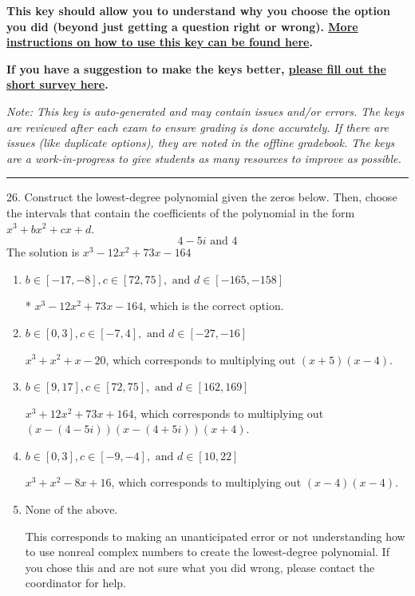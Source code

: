 \documentclass{article}[14pt]
\begin{document}
\textbf{This key should allow you to understand why you choose the option you did (beyond just getting a question right or wrong). \href{https://xronos.clas.ufl.edu/mac1105spring2020/courseDescriptionAndMisc/Exams/LearningFromResults}{More instructions on how to use this key can be found here}.}

\textbf{If you have a suggestion to make the keys better, \href{https://forms.gle/CZkbZmPbC9XALEE88}{please fill out the short survey here}.}

\textit{Note: This key is auto-generated and may contain issues and/or errors. The keys are reviewed after each exam to ensure grading is done accurately. If there are issues (like duplicate options), they are noted in the offline gradebook. The keys are a work-in-progress to give students as many resources to improve as possible.}

\rule{\textwidth}{0.4pt}

26. Construct the lowest-degree polynomial given the zeros below. Then, choose the intervals that contain the coefficients of the polynomial in the form $x^3+bx^2+cx+d$.
$$ 4 - 5i \text{ and } 4 $$ 
The solution is $ x^{3} -12 x^{2} +73 x -164 $ 

\begin{enumerate}[label=\Alph*.] 
\item $ b \in [-17, -8], c \in [72, 75], \text{ and } d \in [-165, -158] $ 

 * $x^{3} -12 x^{2} +73 x -164$, which is the correct option. 
\item $ b \in [0, 3], c \in [-7, 4], \text{ and } d \in [-27, -16] $ 

 $x^{3} + x^{2} +x -20$, which corresponds to multiplying out $(x + 5)(x -4)$. 
\item $ b \in [9, 17], c \in [72, 75], \text{ and } d \in [162, 169] $ 

 $x^{3} +12 x^{2} +73 x + 164$, which corresponds to multiplying out $(x-(4 - 5i))(x-(4 + 5i))(x + 4)$. 
\item $ b \in [0, 3], c \in [-9, -4], \text{ and } d \in [10, 22] $ 

 $x^{3} + x^{2} -8 x + 16$, which corresponds to multiplying out $(x -4)(x -4)$. 
\item $ \text{None of the above.} $ 

 This corresponds to making an unanticipated error or not understanding how to use nonreal complex numbers to create the lowest-degree polynomial. If you chose this and are not sure what you did wrong, please contact the coordinator for help. 
\end{enumerate} 
 
\end{document}

